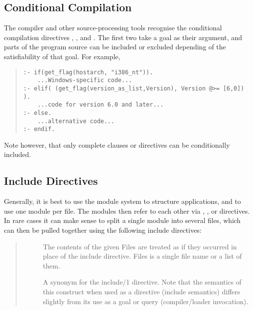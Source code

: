 \subsection{Conditional Compilation}

The compiler and other source-processing tools recognise the conditional
compilation directives
,
,
 and
.
The first two
take a goal as their argument, and parts of the program source can be
included or excluded depending of the satisfiability of that goal.
For example,
\begin{quote}
\begin{verbatim}
:- if(get_flag(hostarch, "i386_nt")).
    ...Windows-specific code...
:- elif( (get_flag(version_as_list,Version), Version @>= [6,0]) ).
    ...code for version 6.0 and later...
:- else.
    ...alternative code...
:- endif.
\end{verbatim}
\end{quote}
Note however, that only complete clauses or directives can be
conditionally included.


\subsection{Include Directives}
\label{secinclude}

Generally, it is best to use the module system to structure {\eclipse}
applications, and to use one module per file.  The modules then refer
to each other via , , or
 directives.
In rare cases it can make sense to split a single module into several
files, which can then be pulled together using the following include
directives:

\begin{quote}
\begin{description}
\item[]
The contents of the given Files are treated as if they occurred in place of
the include directive.  Files is a single file name or a list of them.

\item[]
A synonym for the include/1 directive.  Note that the semantics of this
construct when used as a directive (include semantics) differs slightly
from its use as a goal or query (compiler/loader invocation).
\end{description}
\end{quote}

